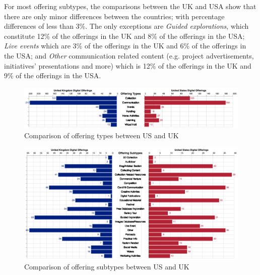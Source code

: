 \documentclass{egpubl}
\begin{document}
For most offering subtypes, the comparisons between the UK and USA show that there are only minor differences between the countries; with percentage differences of less than 3\%. The only exceptions are \emph{Guided explorations}, which constitute 12\% of the offerings in the UK and 8\% of the offerings in the USA; \emph{Live events} which are 3\% of the offerings in the UK and 6\% of the offerings in the USA; and \emph{Other} communication related content (e.g. project advertisements, initiatives' presentations and more)  which is 12\% of the offerings in the UK and 9\% of the offerings in the USA.
 
\begin{figure}[h]
  \centering
  \includegraphics[width=\linewidth]{images/typecomparison.png}
  \caption{\label{fig:TypeComparisonUKUS}
           Comparison of offering types between US and UK}
\end{figure}
\begin{figure}[h]
  \centering
  \includegraphics[width=\linewidth]{images/subtypecomparison.png}
  \caption{\label{fig:SubTypeComparisonUKUS}
           Comparison of offering subtypes between US and UK}
\end{figure}

 
\end{document}

